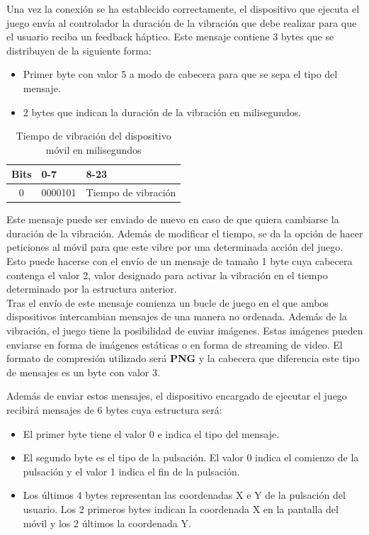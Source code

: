 Una vez la conexi\'on se ha establecido correctamente, el dispositivo que ejecuta el juego env\'ia al controlador la duraci\'on de la vibraci\'on que debe realizar para que el usuario reciba un feedback h\'aptico. Este mensaje contiene 3 bytes que se distribuyen de la siguiente forma:

\begin {itemize}
\item Primer byte con valor 5 a modo de cabecera para que se sepa el tipo del mensaje.
\item 2 bytes que indican la duraci\'on de la vibraci\'on en milisegundos.
\end {itemize}

\begin{table}[h!]
\centering
\begin{tabular}{|l|l|l|} 
\hline
Bits                    & 0-7                   & 8-23                   \\
\hline
\multicolumn{1}{|c|}{0} & \multicolumn{1}{c|}{0000101} & \multicolumn{1}{c|}{Tiempo de vibraci\'on}  \\
\hline
\end{tabular}
\caption{Tiempo de vibraci\'on del dispositivo m\'ovil en milisegundos}
\label{table:2}
\end{table}

Este mensaje puede ser enviado de nuevo en caso de que quiera cambiarse la duraci\'on de la vibraci\'on. Adem\'as de modificar el tiempo, se da la opci\'on de hacer peticiones al m\'ovil para que este vibre por una determinada acci\'on del juego. Esto puede hacerse con el env\'io de un mensaje de tama\~no 1 byte cuya cabecera contenga el valor 2, valor designado para activar la vibraci\'on en el tiempo determinado por la estructura anterior.\\

Tras el env\'io de este mensaje comienza un bucle de juego en el que ambos dispositivos intercambian mensajes de una manera no ordenada. Adem\'as de la vibraci\'on, el juego tiene la posibilidad de enviar im\'agenes. Estas im\'agenes pueden enviarse en forma de im\'agenes est\'aticas o en forma de streaming de video. El formato de compresi\'on utilizado ser\'a \textbf{PNG} y la cabecera que diferencia este tipo de mensajes es un byte con valor 3.

Adem\'as de enviar estos mensajes, el dispositivo encargado de ejecutar el juego recibir\'a mensajes de 6 bytes cuya estructura ser\'a:
\begin {itemize}
\item El primer byte tiene el valor 0 e indica el tipo del mensaje.
\item El segundo byte es el tipo de la pulsaci\'on. El valor 0 indica el comienzo de la pulsaci\'on y el valor 1 indica el fin de la pulsaci\'on.
\item Los \'ultimos 4 bytes representan las coordenadas X e Y de la pulsaci\'on del usuario. Los 2 primeros bytes indican la coordenada X en la pantalla del m\'ovil y los 2 \'ultimos la coordenada Y.
\end {itemize}

